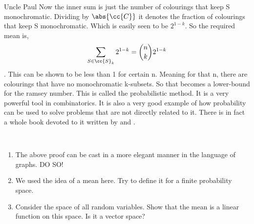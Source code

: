 \documentclass{myclass}
\begin{document}
\begin{yellowbox}{Uncle Paul}
    Now the inner sum is just the number of colourings that keep S monochromatic. Dividing by $\abs{\cc{C}}$ it denotes the fraction of colourings that keep S monochromatic. Which is easily seen to be $2^{1-k}$. 
    So the required mean is,$$\sum_{S\in \cc{S}_k}2^{1-k}=\binom{n}{k} 2^{1-k}$$. This can be shown to be less than 1 for certain n. Meaning for that n, there are colourings that have no monochromatic k-subsets.
    So that becomes a lower-bound for the ramsey number. This is called the probabilistic method. It is a very powerful tool in combinatorics. It is also a very good example of how probability can be used to solve problems that are not directly related to it.
    There is in fact a whole book devoted to it written by  and . 
    
\end{yellowbox}
\begin{exes}
    \hspace{1cm}\\
    \begin{enumerate}\item The above proof can be cast in a more elegant manner in the language of graphs. DO SO!
        \item We used the idea of a mean here. Try to define it for a finite probability space.
        \item Consider the space of all random variables. Show that the mean is a linear function on this space. Is it a vector space?
    \end{enumerate}
\end{exes}
\end{document}
